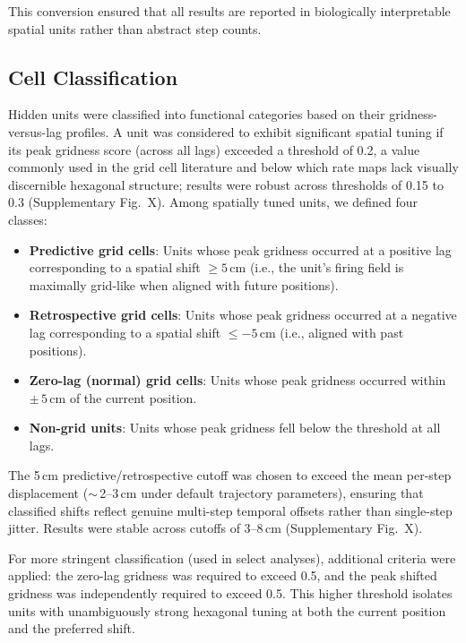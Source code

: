 \documentclass[11pt]{article}
\begin{document}
This conversion ensured that all results are reported in biologically interpretable spatial units rather than abstract step counts.


\subsection*{Cell Classification}

Hidden units were classified into functional categories based on their gridness-versus-lag profiles. A unit was considered to exhibit significant spatial tuning if its peak gridness score (across all lags) exceeded a threshold of 0.2, a value commonly used in the grid cell literature \cite{langston2010} and below which rate maps lack visually discernible hexagonal structure; results were robust across thresholds of 0.15 to 0.3 (Supplementary Fig.~X). Among spatially tuned units, we defined four classes:
\begin{itemize}
    \item \textbf{Predictive grid cells}: Units whose peak gridness occurred at a positive lag corresponding to a spatial shift $\ge 5$\,cm (i.e., the unit's firing field is maximally grid-like when aligned with future positions).
    \item \textbf{Retrospective grid cells}: Units whose peak gridness occurred at a negative lag corresponding to a spatial shift $\le -5$\,cm (i.e., aligned with past positions).
    \item \textbf{Zero-lag (normal) grid cells}: Units whose peak gridness occurred within $\pm\,5$\,cm of the current position.
    \item \textbf{Non-grid units}: Units whose peak gridness fell below the threshold at all lags.
\end{itemize}

The 5\,cm predictive/retrospective cutoff was chosen to exceed the mean per-step displacement ($\sim$\,2--3\,cm under default trajectory parameters), ensuring that classified shifts reflect genuine multi-step temporal offsets rather than single-step jitter. Results were stable across cutoffs of 3--8\,cm (Supplementary Fig.~X).

For more stringent classification (used in select analyses), additional criteria were applied: the zero-lag gridness was required to exceed 0.5, and the peak shifted gridness was independently required to exceed 0.5. This higher threshold isolates units with unambiguously strong hexagonal tuning at both the current position and the preferred shift.
\end{document}

